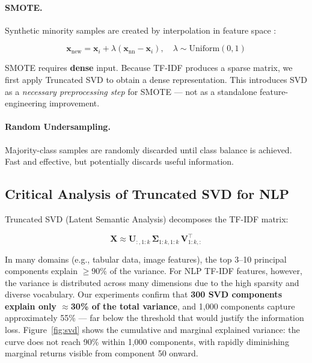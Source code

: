 \documentclass[11pt,a4paper]{article}
\begin{document}
\paragraph{SMOTE.}
Synthetic minority samples are created by interpolation in feature space
\citep{chawla2002smote}:

\begin{equation}
  \mathbf{x}_{\mathrm{new}} = \mathbf{x}_i
  + \lambda(\mathbf{x}_{\mathrm{nn}} - \mathbf{x}_i),
  \quad \lambda \sim \mathrm{Uniform}(0,1)
\end{equation}

SMOTE requires \textbf{dense} input.
Because TF-IDF produces a sparse matrix, we first apply Truncated SVD
to obtain a dense representation.
This introduces SVD as a \emph{necessary preprocessing step} for SMOTE
--- not as a standalone feature-engineering improvement.

\paragraph{Random Undersampling.}
Majority-class samples are randomly discarded until class balance is achieved.
Fast and effective, but potentially discards useful information.

\subsection{Critical Analysis of Truncated SVD for NLP}
\label{sec:svd}

Truncated SVD (Latent Semantic Analysis) decomposes the TF-IDF matrix:

\begin{equation}
  \mathbf{X} \approx \mathbf{U}_{:,1:k}\,\boldsymbol{\Sigma}_{1:k,1:k}\,\mathbf{V}_{1:k,:}^\top
\end{equation}

In many domains (e.g., tabular data, image features), the top 3--10
principal components explain $\geq 90\%$ of the variance.
For NLP TF-IDF features, however, the variance is distributed across
many dimensions due to the high sparsity and diverse vocabulary.
Our experiments confirm that \textbf{300 SVD components explain only
$\approx$30\% of the total variance}, and 1,000 components capture
approximately 55\% --- far below the threshold that would justify the
information loss.
Figure~\ref{fig:svd} shows the cumulative and marginal explained variance:
the curve does not reach 90\% within 1,000 components,
with rapidly diminishing marginal returns visible from component 50 onward.
\end{document}
